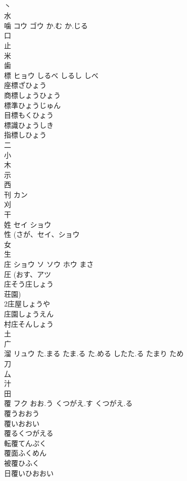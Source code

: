 \documentclass[8pt]{extreport}
\begin{document}
\begin{CJK}{UTF8}{min}
\\	丶 
\\	水 
\\	噛	コウ ゴウ	か.む か.じる	
\\	口 
\\	止 
\\	米 
\\	歯 
\\	標	ヒョウ	しるべ しるし しべ	
\\	座標ざひょう
\\	商標しょうひょう
\\	標準ひょうじゅん
\\	目標もくひょう
\\	標識ひょうしき
\\	指標しひょう
\\	二 
\\	小 
\\	木 
\\	示 
\\	西 
\\	刊	カン		
\\	刈 
\\	干 
\\	姓	セイ ショウ		
\\	性 (さが、セイ、ショウ 
\\	女 
\\	生 
\\	庄	ショウ ソ ソウ ホウ	まさ	
\\	圧 (おす、アツ 
\\	庄そう庄しょう
\\	荘園) 
\\	2庄屋しょうや
\\	庄園しょうえん
\\	村庄そんしょう
\\	土 
\\	广 
\\	溜	リュウ	た.まる たま.る た.める したた.る たまり ため	
\\	刀 
\\	厶 
\\	汁 
\\	田 
\\	覆	フク	おお.う くつがえ.す くつがえ.る	
\\	覆うおおう
\\	覆いおおい
\\	覆るくつがえる
\\	転覆てんぷく
\\	覆面ふくめん
\\	被覆ひふく
\\	日覆いひおおい

\end{CJK}
\end{document}
